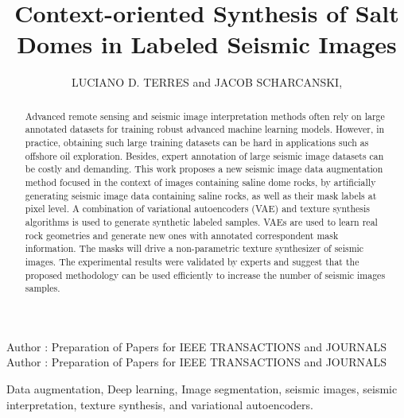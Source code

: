 \documentclass{ieeeaccess}
\begin{document}

\title{Context-oriented Synthesis of Salt Domes in Labeled Seismic Images}
\author{\uppercase{Luciano D. Terres} and
\uppercase{Jacob Scharcanski},  }

\address[1]{Institute of Informatics,
Federal University of Rio Grande do Sul, Porto Alegre, RS, Brasil, 91501-970 (e-mail: ldterres@inf.ufrgs.br; jacobs@inf.ufrgs.br)}

\markboth
{Author \headeretal: Preparation of Papers for IEEE TRANSACTIONS and JOURNALS}
{Author \headeretal: Preparation of Papers for IEEE TRANSACTIONS and JOURNALS}



\begin{abstract}
Advanced remote sensing and seismic image interpretation methods often rely on large annotated datasets for training robust advanced machine learning models. However, in practice, obtaining such large training datasets can be hard in applications such as offshore oil exploration. Besides, expert annotation of large seismic image datasets can be costly and demanding. This work proposes a new seismic image data augmentation method focused in the context of images containing saline dome rocks, by artificially generating seismic image data containing saline rocks, as well as their mask labels at pixel level. A combination of variational autoencoders (VAE) and texture synthesis algorithms is used to generate synthetic labeled samples. VAEs are used to learn real rock geometries and generate new ones with annotated correspondent mask information. The masks will drive a non-parametric texture synthesizer of seismic images. The experimental results were validated by experts and suggest that the proposed methodology can be used efficiently to increase the number of seismic images samples. 
\end{abstract}

\begin{keywords}
Data augmentation, Deep learning, Image segmentation, seismic images, seismic interpretation, texture synthesis, and variational autoencoders.
\end{keywords}

\titlepgskip=-21pt

\maketitle
\end{document}
